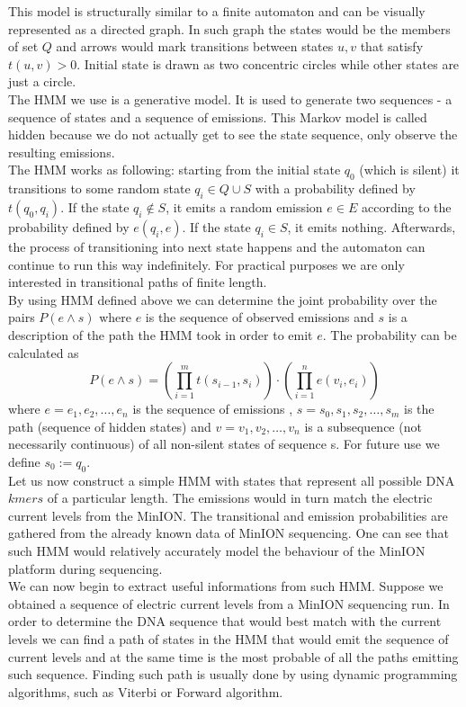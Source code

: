 This model is structurally similar to a finite automaton and can be visually represented as a directed graph. In such graph the states would be the members of set $Q$ and arrows would mark transitions between states $u,v$ that satisfy $t(u,v) > 0$. Initial state is drawn as two concentric circles while other states are just a circle.\\
The HMM we use is a generative model. It is used to generate two sequences - a sequence of states and a sequence of emissions. This Markov model is called hidden because we do not actually get to see the state sequence, only observe the resulting emissions.\\

The HMM works as following: starting from the initial state $q_0$ (which is silent) it transitions to some random state $q_i \in Q \cup S$ with a probability defined by $t(q_0, q_i)$. If the state $q_i \not\in S$, it emits a random emission $e \in E$ according to the probability defined by $e(q_i, e)$. If the state $q_i \in S$, it emits nothing. Afterwards, the process of transitioning into next state happens and the automaton can continue to run this way indefinitely. 
For practical purposes we are only interested in transitional paths of finite length.\\

By using HMM defined above we can determine the joint probability over the pairs $P(e \land s)$ where $e$ is the sequence of observed emissions and $s$ is a description of the path the HMM took in order to emit $e$. The probability can be calculated as
$$P(e \land s) = (\prod_{i=1}^{m}{t(s_{i-1}, s_i)}) \cdot (\prod_{i=1}^{n}{e(v_i, e_i)})$$
where $e = e_1,e_2,\dots,e_n$ is the sequence of emissions , $s = s_0, s_1, s_2, \dots, s_m$ is the path (sequence of hidden states) and $v = v_1, v_2, \dots, v_n$ is a subsequence (not necessarily continuous) of all non-silent states of sequence s. For future use we define $s_0 := q_0$.\\

Let us now construct a simple HMM with states that represent all possible DNA $kmers$ of a particular length. The emissions would in turn match the electric current levels from the MinION. The transitional and emission probabilities are gathered from the already known data of MinION sequencing. One can see that such HMM would relatively accurately model the behaviour of the MinION platform during sequencing.\\
We can now begin to extract useful informations from such HMM. Suppose we obtained a sequence of electric current levels from a MinION sequencing run. In order to determine the DNA sequence that would best match with the current levels we can find a path of states in the HMM that would emit the sequence of current levels and at the same time is the most probable of all the paths emitting such sequence.
Finding such path is usually done by using dynamic programming algorithms, such as Viterbi or Forward algorithm. \cite{durbin1998}


